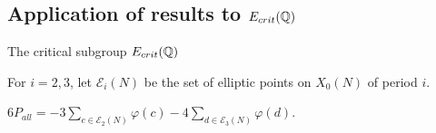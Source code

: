 \documentclass[handout]{beamer}
\begin{document}
\subsection{Application of results to $E_{crit}(\mathbb{Q})$}

\begin{frame}{The critical subgroup $E_{crit}(\mathbb{Q})$}





For $i = 2,3$, let $\mathscr{E}_i(N)$ be the set of elliptic points on $X_0(N)$ of period $i$. \\

\pause
\begin{Lemma}[C.]
$6 P_{all} =  - 3 \sum_{c \in \mathscr{E}_2(N)} \varphi(c) - 4 \sum_{d \in \mathscr{E}_3(N)} \varphi(d)$. \\
\end{Lemma}


\end{frame}
\end{document}
